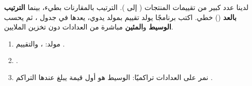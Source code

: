 \begin{statement}
لدينا عدد كبير من تقييمات المنتجات ( إلى ). الترتيب بالمقارنات بطيء، بينما \textbf{الترتيب بالعد} () خطي. اكتب برنامجًا يولد  تقييم بمولد  يدوي، يعدها في جدول ، ثم يحسب \textbf{الوسيط} و\textbf{المئين } مباشرة من العدادات دون تخزين الملايين.
\end{statement}
\begin{stepsbox}\begin{enumerate}
\item مولد: ، والتقييم .
\item {}.
\item نمر على العدادات تراكميًا: الوسيط هو أول قيمة يبلغ عندها التراكم .
\end{enumerate}\end{stepsbox}

